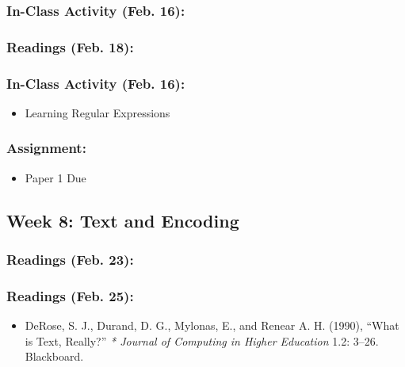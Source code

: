 \documentclass[]{article}
\begin{document}
\subsubsection{In-Class Activity (Feb.
16):}\label{in-class-activity-feb.-16}

\subsubsection{Readings (Feb. 18):}\label{readings-feb.-18}

\subsubsection{In-Class Activity (Feb.
16):}\label{in-class-activity-feb.-16-1}

\begin{itemize}
\itemsep1pt\parskip0pt
\item
  Learning Regular Expressions
\end{itemize}

\subsubsection{Assignment:}\label{assignment}

\begin{itemize}
\itemsep1pt\parskip0pt
\item
  Paper 1 Due
\end{itemize}

\subsection{Week 8: Text and Encoding}\label{week-8-text-and-encoding}

\subsubsection{Readings (Feb. 23):}\label{readings-feb.-23}

\subsubsection{Readings (Feb. 25):}\label{readings-feb.-25}

\begin{itemize}
\itemsep1pt\parskip0pt
\item
  DeRose, S. J., Durand, D. G., Mylonas, E., and Renear A. H. (1990),
  ``What is Text, Really?'' \emph{* Journal of Computing in Higher
  Education} 1.2: 3--26. Blackboard.
\end{itemize}
\end{document}

